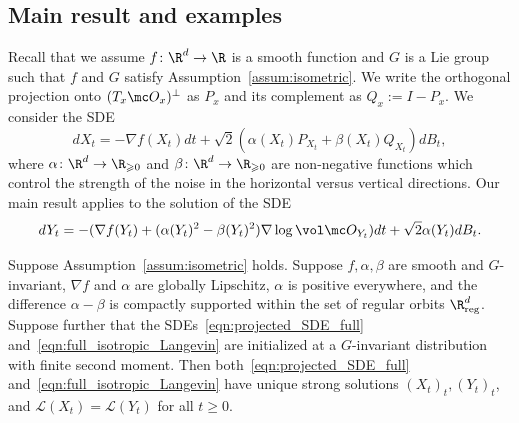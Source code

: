 \documentclass[twoside,a4paper,11pt]{article}
\newcommand{\reg}{\mathrm{reg}}
\theoremstyle{plain}
\begin{document}
\subsection{Main result and examples}
\label{subsec:main_result}
Recall that we assume $f \colon \R^d
 \to \R$ is a smooth
 function and $G$ is a Lie group
 such that $f$ and $G$
 satisfy Assumption~\ref{assum:isometric}.
 We write the orthogonal projection
 onto $(T_x \mc O_x)^{\perp}$ as $P_x$ and its complement
 as $Q_x := I - P_x$.
 We consider the SDE
\begin{equation}\label{eqn:projected_SDE_full}
dX_t = -\nabla f(X_t)dt + \sqrt{2}(\alpha(X_t)P_{X_t}
+ \beta(X_t)Q_{X_t})dB_t,
\end{equation}
where $\alpha \colon \R^d \to \R_{\geqslant 0}$ and $\beta \colon \R^d \to \R_{\geqslant 0}$
are non-negative functions which
control the strength of
the noise in the horizontal
versus vertical directions.
Our main result applies to the solution of the SDE
\begin{equation}\label{eqn:full_isotropic_Langevin}
dY_t = -(\nabla f(Y_t) + (\alpha(Y_t)^2
-\beta(Y_t)^2)\nabla \log \vol \mc O_{Y_t})dt + \sqrt{2}\alpha(Y_t)dB_t.
\end{equation}
\begin{theorem}\label{thm:main}
Suppose Assumption~\ref{assum:isometric} holds.
Suppose $f, \alpha, \beta$
are smooth and $G$-invariant,
$\nabla f$ and
$\alpha$ are
globally Lipschitz, $\alpha$ is positive everywhere,
and the difference $\alpha - \beta$ 
is compactly supported
within the set of regular orbits $\R^d_{\reg}$.
Suppose further
that the SDEs~\eqref{eqn:projected_SDE_full}
and~\eqref{eqn:full_isotropic_Langevin}
are initialized at a $G$-invariant
distribution with finite second
moment.
Then both~\eqref{eqn:projected_SDE_full}
and~\eqref{eqn:full_isotropic_Langevin}
have unique strong solutions
$(X_t)_t, (Y_t)_t$,
and $\mathcal{L}(X_t) = \mathcal{L}(Y_t)$ 
for all $t \geqslant 0$.
\end{theorem}
\end{document}
